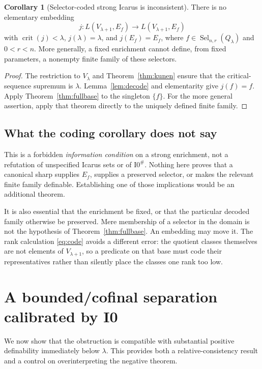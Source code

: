 \documentclass[11pt,letterpaper]{article}
\theoremstyle{definition}
\newtheorem{corollary}[definition]{Corollary}
\newcommand{\crit}{\operatorname{crit}}
\newcommand{\Izero}{\mathrm{I0}}
\newcommand{\Sel}{\operatorname{Sel}}
\begin{document}
\begin{corollary}[Selector-coded strong Icarus is inconsistent]\label{cor:icarus}
There is no elementary embedding
\[
 j:L(V_{\lambda+1},E_f)\to L(V_{\lambda+1},E_f)
\]
with $\crit(j)<\lambda$, $j(\lambda)=\lambda$, and $j(E_f)=E_f$, where $f\in\Sel_{n,r}(Q_\lambda)$ and $0<r<n$.
More generally, a fixed enrichment cannot define, from fixed parameters, a nonempty finite family of these selectors.
\end{corollary}

\begin{proof}
The restriction to $V_\lambda$ and Theorem~\ref{thm:kunen} ensure that the critical-sequence supremum is $\lambda$. Lemma~\ref{lem:decode} and elementarity give $j(f)=f$. Apply Theorem~\ref{thm:fullbase} to the singleton $\{f\}$. For the more general assertion, apply that theorem directly to the uniquely defined finite family.
\end{proof}

\subsection{What the coding corollary does not say}

This is a forbidden \emph{information condition} on a strong enrichment, not a refutation of unspecified Icarus sets or of $\Izero^{\#}$. Nothing here proves that a canonical sharp supplies $E_f$, supplies a preserved selector, or makes the relevant finite family definable. Establishing one of those implications would be an additional theorem.

It is also essential that the enrichment be fixed, or that the particular decoded family otherwise be preserved. Mere membership of a selector in the domain is not the hypothesis of Theorem~\ref{thm:fullbase}. An embedding may move it. The rank calculation \eqref{eq:code} avoids a different error: the quotient classes themselves are not elements of $V_{\lambda+1}$, so a predicate on that base must code their representatives rather than silently place the classes one rank too low.

\section{A bounded/cofinal separation calibrated by I0}\label{sec:consistency}

We now show that the obstruction is compatible with substantial positive definability immediately below $\lambda$. This provides both a relative-consistency result and a control on overinterpreting the negative theorem.
\end{document}
